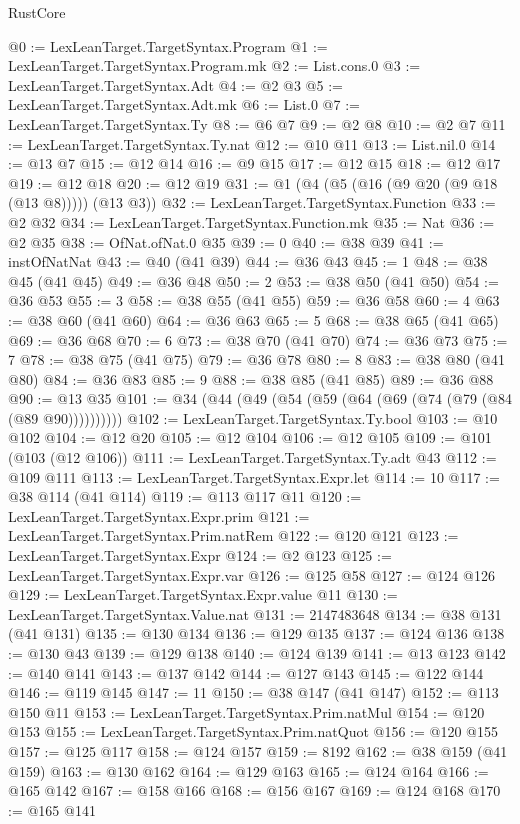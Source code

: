 \begin{lexlean}{RustCore}
\begin{coremodule}
@0 := LexLeanTarget.TargetSyntax.Program
@1 := LexLeanTarget.TargetSyntax.Program.mk
@2 := List.cons.{0}
@3 := LexLeanTarget.TargetSyntax.Adt
@4 := @2 @3
@5 := LexLeanTarget.TargetSyntax.Adt.mk
@6 := List.{0}
@7 := LexLeanTarget.TargetSyntax.Ty
@8 := @6 @7
@9 := @2 @8
@10 := @2 @7
@11 := LexLeanTarget.TargetSyntax.Ty.nat
@12 := @10 @11
@13 := List.nil.{0}
@14 := @13 @7
@15 := @12 @14
@16 := @9 @15
@17 := @12 @15
@18 := @12 @17
@19 := @12 @18
@20 := @12 @19
@31 := @1 (@4 (@5 (@16 (@9 @20 (@9 @18 (@13 @8))))) (@13 @3))
@32 := LexLeanTarget.TargetSyntax.Function
@33 := @2 @32
@34 := LexLeanTarget.TargetSyntax.Function.mk
@35 := Nat
@36 := @2 @35
@38 := OfNat.ofNat.{0} @35
@39 := 0
@40 := @38 @39
@41 := instOfNatNat
@43 := @40 (@41 @39)
@44 := @36 @43
@45 := 1
@48 := @38 @45 (@41 @45)
@49 := @36 @48
@50 := 2
@53 := @38 @50 (@41 @50)
@54 := @36 @53
@55 := 3
@58 := @38 @55 (@41 @55)
@59 := @36 @58
@60 := 4
@63 := @38 @60 (@41 @60)
@64 := @36 @63
@65 := 5
@68 := @38 @65 (@41 @65)
@69 := @36 @68
@70 := 6
@73 := @38 @70 (@41 @70)
@74 := @36 @73
@75 := 7
@78 := @38 @75 (@41 @75)
@79 := @36 @78
@80 := 8
@83 := @38 @80 (@41 @80)
@84 := @36 @83
@85 := 9
@88 := @38 @85 (@41 @85)
@89 := @36 @88
@90 := @13 @35
@101 := @34 (@44 (@49 (@54 (@59 (@64 (@69 (@74 (@79 (@84 (@89 @90))))))))))
@102 := LexLeanTarget.TargetSyntax.Ty.bool
@103 := @10 @102
@104 := @12 @20
@105 := @12 @104
@106 := @12 @105
@109 := @101 (@103 (@12 @106))
@111 := LexLeanTarget.TargetSyntax.Ty.adt @43
@112 := @109 @111
@113 := LexLeanTarget.TargetSyntax.Expr.let
@114 := 10
@117 := @38 @114 (@41 @114)
@119 := @113 @117 @11
@120 := LexLeanTarget.TargetSyntax.Expr.prim
@121 := LexLeanTarget.TargetSyntax.Prim.natRem
@122 := @120 @121
@123 := LexLeanTarget.TargetSyntax.Expr
@124 := @2 @123
@125 := LexLeanTarget.TargetSyntax.Expr.var
@126 := @125 @58
@127 := @124 @126
@129 := LexLeanTarget.TargetSyntax.Expr.value @11
@130 := LexLeanTarget.TargetSyntax.Value.nat
@131 := 2147483648
@134 := @38 @131 (@41 @131)
@135 := @130 @134
@136 := @129 @135
@137 := @124 @136
@138 := @130 @43
@139 := @129 @138
@140 := @124 @139
@141 := @13 @123
@142 := @140 @141
@143 := @137 @142
@144 := @127 @143
@145 := @122 @144
@146 := @119 @145
@147 := 11
@150 := @38 @147 (@41 @147)
@152 := @113 @150 @11
@153 := LexLeanTarget.TargetSyntax.Prim.natMul
@154 := @120 @153
@155 := LexLeanTarget.TargetSyntax.Prim.natQuot
@156 := @120 @155
@157 := @125 @117
@158 := @124 @157
@159 := 8192
@162 := @38 @159 (@41 @159)
@163 := @130 @162
@164 := @129 @163
@165 := @124 @164
@166 := @165 @142
@167 := @158 @166
@168 := @156 @167
@169 := @124 @168
@170 := @165 @141

\end{coremodule}
\end{lexlean}
